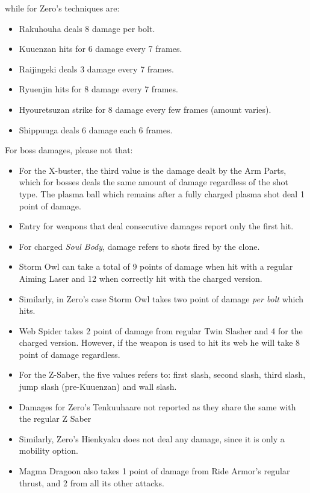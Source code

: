 while for Zero's techniques are:
\begin{itemize}
	\item Rakuhouha deals 8 damage per bolt. 
	\item Kuuenzan hits for 6 damage every 7 frames.
	\item Raijingeki deals 3 damage every 7 frames.
	\item Ryuenjin hits for 8 damage every 7 frames.
	\item Hyouretsuzan strike for 8 damage every few frames (amount varies).
	\item Shippuuga deals 6 damage each 6 frames.
\end{itemize}
For boss damages, please not that:
\begin{itemize}
	\item For the X-buster, the third value is the damage dealt by the Arm Parts, which for bosses deals the same amount of damage regardless of the shot type. The plasma ball which remains after a fully charged plasma shot deal 1 point of damage. 
	\item Entry for weapons that deal consecutive damages report only the first hit.
	\item For charged \emph{Soul Body}, damage refers to shots fired by the clone.
	\item Storm Owl can take a total of 9 points of damage when hit with a regular Aiming Laser and 12 when correctly hit with the charged version.
	\item Similarly, in Zero's case Storm Owl takes two point of damage \textit{per bolt} which hits.
	\item Web Spider takes 2 point of damage from regular Twin Slasher and 4 for the charged version. However, if the weapon is used to hit its web he will take 8 point of damage regardless.
	\item For the Z-Saber, the five values refers to: first slash, second slash, third slash, jump slash (pre-Kuuenzan) and wall slash.
	\item Damages for Zero's Tenkuuhaare not reported as they share the same with the regular Z Saber
	\item Similarly, Zero's Hienkyaku does not deal any damage, since it is only a mobility option.
	\item Magma Dragoon also takes 1 point of damage from Ride Armor's regular thrust, and 2 from all its other attacks.

\end{itemize}

